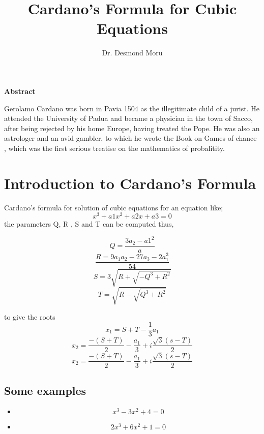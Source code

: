 \documentclass{article}
\begin{document}
	\author{Dr. Desmond Moru}
	\title{Cardano's Formula for Cubic Equations}
	\maketitle
	
	
	
	\begin{center}
		\textbf{Abstract}
	\end{center}
	Gerolamo Cardano was born in Pavia 1504 as the illegitimate child of a jurist. He attended the University of Padua and became a physician in the town of Sacco, after being rejected by his home Europe, having treated the Pope. He was also an astrologer and an avid gambler, to which he wrote the Book on Games of chance , which was the first serious treatise on the mathematics of probalitity. \cite{cardano}
	
	\section{ Introduction to Cardano's Formula}
	Cardano's formula for solution of cubic equations for an equation like;
	\begin{equation}
		x^3 + a1x^2 + a2x + a3 = 0
	\end{equation}
	the parameters Q, R , S and T can be computed thus,
	
	\begin{equation}
		Q= \frac{3a_{2} - a{1}^2}{a}
	\end{equation}
\begin{equation}
\frac{R=9a_{1}a_{2}-27a_{3}-2a_{1}^3}{54}	
\end{equation}
\begin{equation}
	S=3\sqrt{R +\sqrt{-Q^3 + R^2}}
\end{equation}
\begin{equation}
	T=\sqrt{R-\sqrt{Q^3 + R^2}}
\end{equation}

to give the roots
\begin{equation}
	x_{1}= S + T -\frac{1}{3}a_{1}
\end{equation}
\begin{equation}
		x_{2} =\frac{-(S +T)}{2} -\frac{a_{1}}{3} + i\frac{\sqrt{3}(s-T)}{2}
\end{equation}
\begin{equation}
	x_{2} =\frac{-(S +T)}{2} -\frac{a_{1}}{3} + i\frac{\sqrt{3}(s-T)}{2}
\end{equation}
\subsection{Some examples}

\begin{itemize}
\item	\begin{equation}
		x^3 - 3x^2 + 4 =0
	\end{equation}
\item\begin{equation}
	2x^3 + 6x^2 + 1 =0
\end{equation}
\end{itemize}



\end{document}
